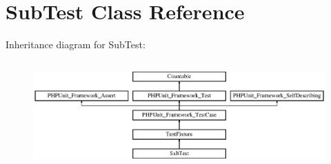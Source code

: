 \section{Sub\+Test Class Reference}
\label{class_sub_test}
Inheritance diagram for Sub\+Test\+:\begin{figure}[H]
\begin{center}
\leavevmode
\includegraphics[height=4.129793cm]{class_sub_test}
\end{center}
\end{figure}
